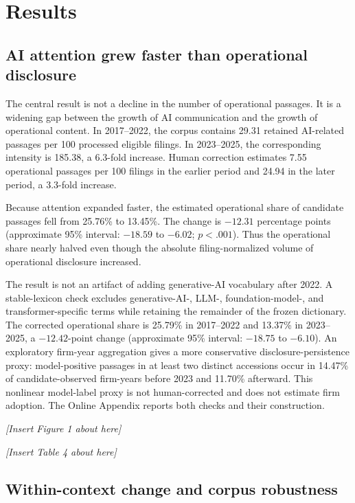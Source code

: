 \documentclass[12pt]{article}
\newcommand{\placement}[1]{%
  \begin{center}
    \vspace{0.5\baselineskip}
    \textit{[Insert #1 about here]}
    \vspace{0.5\baselineskip}
  \end{center}
}
\begin{document}
\section{Results}

\subsection{AI attention grew faster than operational disclosure}

The central result is not a decline in the number of operational passages.
It is a widening gap between the growth of AI communication and the growth of
operational content. In 2017--2022, the corpus contains 29.31 retained
AI-related passages per 100 processed eligible filings. In 2023--2025, the
corresponding intensity is 185.38, a 6.3-fold increase. Human correction
estimates 7.55 operational passages per 100 filings in the earlier period and
24.94 in the later period, a 3.3-fold increase.

Because attention expanded faster, the estimated operational share of
candidate passages fell from 25.76\% to 13.45\%. The change is $-12.31$
percentage points (approximate 95\% interval: $-18.59$ to $-6.02$;
$p<.001$). Thus the operational share nearly halved even though the absolute
filing-normalized volume of operational disclosure increased.

The result is not an artifact of adding generative-AI vocabulary after 2022.
A stable-lexicon check excludes generative-AI-, LLM-, foundation-model-, and
transformer-specific terms while retaining the remainder of the frozen
dictionary. The corrected operational share is 25.79\% in 2017--2022 and
13.37\% in 2023--2025, a $-12.42$-point change (approximate 95\% interval:
$-18.75$ to $-6.10$). An exploratory firm-year aggregation gives a more
conservative disclosure-persistence proxy: model-positive passages in at
least two distinct accessions occur in 14.47\% of candidate-observed
firm-years before 2023 and 11.70\% afterward. This nonlinear model-label proxy
is not human-corrected and does not estimate firm adoption. The Online
Appendix reports both checks and their construction.

\placement{Figure 1}

\placement{Table 4}

\subsection{Within-context change and corpus robustness}
\end{document}
